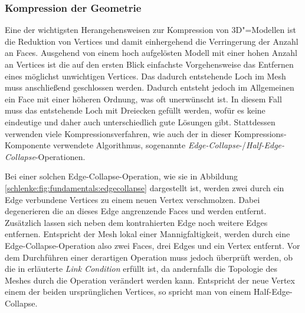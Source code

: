 \subsubsection{Kompression der Geometrie}
\label{schlenke:chp:fundamentals:geocomp}

Eine der wichtigsten Herangehensweisen zur Kompression von 3D"=Modellen ist die Reduktion von Vertices und damit einhergehend die Verringerung der Anzahl an Faces. Ausgehend von einem hoch aufgelösten Modell mit einer hohen Anzahl an Vertices ist die auf den ersten Blick einfachste Vorgehensweise das Entfernen eines möglichst unwichtigen Vertices. Das dadurch entstehende Loch im Mesh muss anschließend geschlossen werden. Dadurch entsteht jedoch im Allgemeinen ein Face mit einer höheren Ordnung, was oft unerwünscht ist. In diesem Fall muss das entstehende Loch mit Dreiecken gefüllt werden, wofür es keine eindeutige und daher auch unterschiedlich gute Lösungen gibt. Stattdessen verwenden viele Kompressionsverfahren, wie auch der in dieser Kompressions-Komponente verwendete Algorithmus, sogenannte \emph{Edge-Collapse}-/\emph{Half-Edge-Collapse}-Operationen.

Bei einer solchen Edge-Collapse-Operation, wie sie in Abbildung \ref{schlenke:fig:fundamentals:edgecollapse} dargestellt ist, werden zwei durch ein Edge verbundene Vertices zu einem neuen Vertex verschmolzen. Dabei degenerieren die an dieses Edge angrenzende Faces und werden entfernt. Zusätzlich lassen sich neben dem kontrahierten Edge noch weitere Edges entfernen. Entspricht der Mesh lokal einer Mannigfaltigkeit, werden durch eine Edge-Collapse-Operation also zwei Faces, drei Edges und ein Vertex entfernt. Vor dem Durchführen einer derartigen Operation muss jedoch überprüft werden, ob die in \cite[S.~118f]{botsch2010} erläuterte \emph{Link Condition} erfüllt ist, da andernfalls die Topologie des Meshes durch die Operation verändert werden kann. Entspricht der neue Vertex einem der beiden ursprünglichen Vertices, so spricht man von einem Half-Edge-Collapse.

